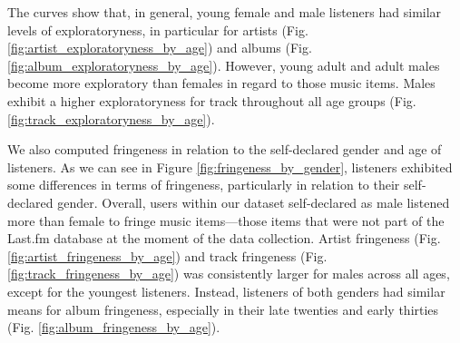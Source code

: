 The curves show that, in general, young female and male listeners had similar levels of exploratoryness, in particular for artists  (Fig. \ref{fig:artist_exploratoryness_by_age}) and albums (Fig. \ref{fig:album_exploratoryness_by_age}). However, young adult and adult males become more exploratory than females in regard to those music items. Males exhibit a higher exploratoryness for track throughout all age groups (Fig. \ref{fig:track_exploratoryness_by_age}).






We also computed fringeness in relation to the self-declared gender and age  of listeners. As we can see in Figure \ref{fig:fringeness_by_gender}, listeners exhibited some differences in terms of fringeness, particularly in relation to their self-declared gender. 
Overall, users within our dataset self-declared as male listened more than female to fringe music items---those items that were not part of the Last.fm database at the moment of the data collection. Artist fringeness (Fig. \ref{fig:artist_fringeness_by_age}) and track fringeness (Fig. \ref{fig:track_fringeness_by_age}) was consistently larger for males across all ages, except for the youngest listeners. Instead, listeners of both genders had similar means for album fringeness, especially in their late twenties and early thirties (Fig. \ref{fig:album_fringeness_by_age}).

